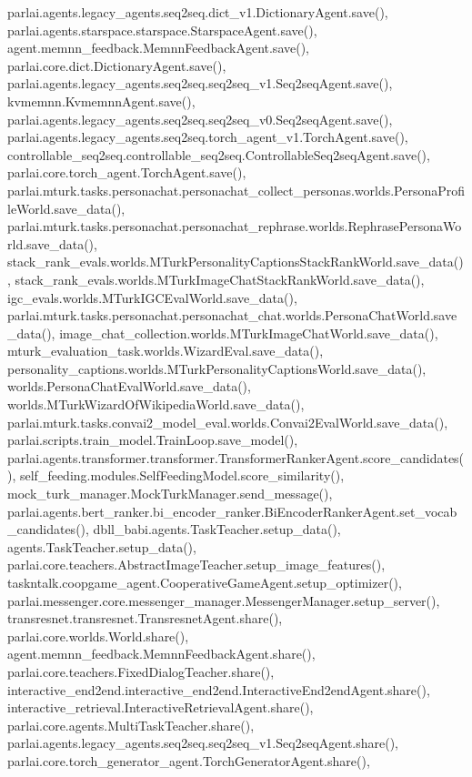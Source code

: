 parlai.\+agents.\+legacy\+\_\+agents.\+seq2seq.\+dict\+\_\+v1.\+Dictionary\+Agent.\+save(), parlai.\+agents.\+starspace.\+starspace.\+Starspace\+Agent.\+save(), agent.\+memnn\+\_\+feedback.\+Memnn\+Feedback\+Agent.\+save(), parlai.\+core.\+dict.\+Dictionary\+Agent.\+save(), parlai.\+agents.\+legacy\+\_\+agents.\+seq2seq.\+seq2seq\+\_\+v1.\+Seq2seq\+Agent.\+save(), kvmemnn.\+Kvmemnn\+Agent.\+save(), parlai.\+agents.\+legacy\+\_\+agents.\+seq2seq.\+seq2seq\+\_\+v0.\+Seq2seq\+Agent.\+save(), parlai.\+agents.\+legacy\+\_\+agents.\+seq2seq.\+torch\+\_\+agent\+\_\+v1.\+Torch\+Agent.\+save(), controllable\+\_\+seq2seq.\+controllable\+\_\+seq2seq.\+Controllable\+Seq2seq\+Agent.\+save(), parlai.\+core.\+torch\+\_\+agent.\+Torch\+Agent.\+save(), parlai.\+mturk.\+tasks.\+personachat.\+personachat\+\_\+collect\+\_\+personas.\+worlds.\+Persona\+Profile\+World.\+save\+\_\+data(), parlai.\+mturk.\+tasks.\+personachat.\+personachat\+\_\+rephrase.\+worlds.\+Rephrase\+Persona\+World.\+save\+\_\+data(), stack\+\_\+rank\+\_\+evals.\+worlds.\+M\+Turk\+Personality\+Captions\+Stack\+Rank\+World.\+save\+\_\+data(), stack\+\_\+rank\+\_\+evals.\+worlds.\+M\+Turk\+Image\+Chat\+Stack\+Rank\+World.\+save\+\_\+data(), igc\+\_\+evals.\+worlds.\+M\+Turk\+I\+G\+C\+Eval\+World.\+save\+\_\+data(), parlai.\+mturk.\+tasks.\+personachat.\+personachat\+\_\+chat.\+worlds.\+Persona\+Chat\+World.\+save\+\_\+data(), image\+\_\+chat\+\_\+collection.\+worlds.\+M\+Turk\+Image\+Chat\+World.\+save\+\_\+data(), mturk\+\_\+evaluation\+\_\+task.\+worlds.\+Wizard\+Eval.\+save\+\_\+data(), personality\+\_\+captions.\+worlds.\+M\+Turk\+Personality\+Captions\+World.\+save\+\_\+data(), worlds.\+Persona\+Chat\+Eval\+World.\+save\+\_\+data(), worlds.\+M\+Turk\+Wizard\+Of\+Wikipedia\+World.\+save\+\_\+data(), parlai.\+mturk.\+tasks.\+convai2\+\_\+model\+\_\+eval.\+worlds.\+Convai2\+Eval\+World.\+save\+\_\+data(), parlai.\+scripts.\+train\+\_\+model.\+Train\+Loop.\+save\+\_\+model(), parlai.\+agents.\+transformer.\+transformer.\+Transformer\+Ranker\+Agent.\+score\+\_\+candidates(), self\+\_\+feeding.\+modules.\+Self\+Feeding\+Model.\+score\+\_\+similarity(), mock\+\_\+turk\+\_\+manager.\+Mock\+Turk\+Manager.\+send\+\_\+message(), parlai.\+agents.\+bert\+\_\+ranker.\+bi\+\_\+encoder\+\_\+ranker.\+Bi\+Encoder\+Ranker\+Agent.\+set\+\_\+vocab\+\_\+candidates(), dbll\+\_\+babi.\+agents.\+Task\+Teacher.\+setup\+\_\+data(), agents.\+Task\+Teacher.\+setup\+\_\+data(), parlai.\+core.\+teachers.\+Abstract\+Image\+Teacher.\+setup\+\_\+image\+\_\+features(), taskntalk.\+coopgame\+\_\+agent.\+Cooperative\+Game\+Agent.\+setup\+\_\+optimizer(), parlai.\+messenger.\+core.\+messenger\+\_\+manager.\+Messenger\+Manager.\+setup\+\_\+server(), transresnet.\+transresnet.\+Transresnet\+Agent.\+share(), parlai.\+core.\+worlds.\+World.\+share(), agent.\+memnn\+\_\+feedback.\+Memnn\+Feedback\+Agent.\+share(), parlai.\+core.\+teachers.\+Fixed\+Dialog\+Teacher.\+share(), interactive\+\_\+end2end.\+interactive\+\_\+end2end.\+Interactive\+End2end\+Agent.\+share(), interactive\+\_\+retrieval.\+Interactive\+Retrieval\+Agent.\+share(), parlai.\+core.\+agents.\+Multi\+Task\+Teacher.\+share(), parlai.\+agents.\+legacy\+\_\+agents.\+seq2seq.\+seq2seq\+\_\+v1.\+Seq2seq\+Agent.\+share(), parlai.\+core.\+torch\+\_\+generator\+\_\+agent.\+Torch\+Generator\+Agent.\+share(), 
